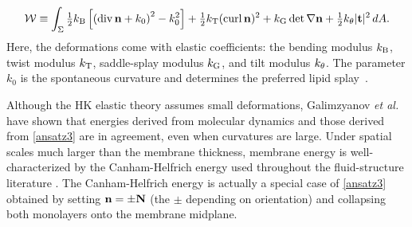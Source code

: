 \begin{equation}
\label{ansatz3}
{\cal W} \equiv \int_{\Sigma} 
  \tfrac{1}{2}k_{\mathrm{B}}\left[ \left( \operatorname{div} {\bf n} + k_0\right)^2 - k_0^2\right] 
+ \tfrac{1}{2}k_{\mathrm{T}} (\operatorname{curl} {\bf n})^2 + k_{\mathrm{G}}  \det \nabla {\bf n} + \tfrac{1}{2}k_{\theta} |{\bf t}|^2 \,dA.
\end{equation}
Here, 
the deformations come with elastic coefficients: the bending modulus
$k_{\mathrm{B}}$, twist modulus $k_{\mathrm{T}}$, saddle-splay modulus $k_{\mathrm{G}}$, and tilt modulus
$k_{\theta}$.
%
The parameter $k_0$ is the spontaneous curvature and determines the
preferred lipid splay~\cite{RoLi15,Kozlov2007}.  

Although the HK elastic theory assumes small deformations, 
Galimzyanov {\em et al.}~\cite{C9SM02079A} have shown that energies derived from
molecular dynamics and those derived from \eqref{ansatz3} are in agreement, even when curvatures are large.
Under spatial scales much larger than the
membrane thickness, membrane energy is well-characterized by the
Canham-Helfrich energy used throughout the fluid-structure literature
\cite{QiangDu09, Lowengrub07,KimLai2010_JCP, Hu, HuLaiSeolEtAl2016_JCP,
  qua-bir2014, qua-vee-you2019}.
The Canham-Helfrich energy is actually a special case of
\eqref{ansatz3} obtained by setting ${\bf n} =  \pm {\bf N}$ (the $\pm$ depending on
orientation) and collapsing both monolayers onto the membrane midplane.

